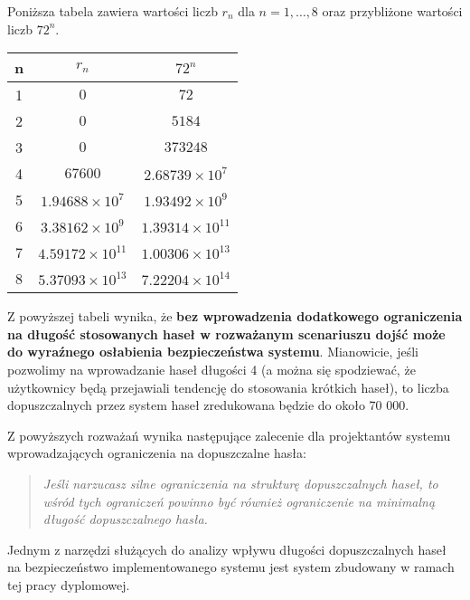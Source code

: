 Poniższa tabela zawiera wartości liczb $r_n$ dla $n=1,\ldots,8$ oraz przybliżone wartości liczb $72^n$. 
\begin{center}
\begin{tabular}{|c|c|c|}
 \hline
 n & $r_n$ & $72^n$ \\ \hline  
 1 & $0$ & $72$ \\
 2 & $0$ & $5184$ \\
 3 & $0$ & $373248$ \\
 4 & $67600$ & $2.68739\times 10^7$ \\
 5 & $1.94688\times 10^7$    & $1.93492\times 10^9$ \\
 6 & $3.38162\times 10^9$    & $1.39314\times 10^{11}$ \\
 7 & $4.59172\times 10^{11}$ & $1.00306\times 10^{13}$ \\
 8 & $5.37093\times 10^{13}$ & $7.22204\times 10^{14}$ \\ \hline
\end{tabular}
\end{center}
Z powyższej tabeli wynika, że \textbf{bez wprowadzenia dodatkowego ograniczenia na długość stosowanych haseł w rozważanym scenariuszu dojść może do wyraźnego osłabienia bezpieczeństwa systemu}. Mianowicie, jeśli pozwolimy na wprowadzanie haseł długości 4 (a można się spodziewać, że użytkownicy będą przejawiali tendencję do stosowania krótkich haseł), to liczba dopuszczalnych przez system haseł zredukowana będzie do około 70 000.

Z powyższych rozważań wynika następujące zalecenie dla projektantów systemu wprowadzających ograniczenia na dopuszczalne hasła: 
\begin{quote}
  \emph{Jeśli narzucasz silne ograniczenia na strukturę dopuszczalnych haseł, to wśród tych ograniczeń powinno być również ograniczenie na minimalną długość dopuszczalnego hasła.}   
\end{quote}  
Jednym z narzędzi służących do analizy wpływu długości dopuszczalnych haseł na bezpieczeństwo implementowanego systemu jest system zbudowany w ramach tej pracy dyplomowej.
